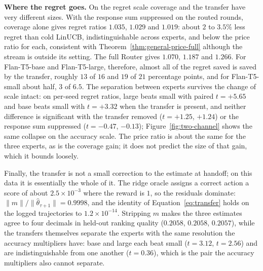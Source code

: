 \documentclass[anon]{alt2027} %
\begin{document}
\textbf{Where the regret goes.} On the regret scale coverage and the transfer
have very different sizes. With the response sum suppressed on the routed
rounds, coverage alone gives regret ratios $1.035$, $1.029$ and $1.019$:
about $2$ to $3.5\%$ less regret than cold LinUCB, indistinguishable across
experts, and below the price ratio for each, consistent with
Theorem~\ref{thm:general-price-full} although the stream is outside its setting.
The full Router gives $1.070$, $1.187$ and $1.266$. For Flan-T5-base and
Flan-T5-large, therefore, almost all of the regret saved is saved by the
transfer, roughly $13$ of $16$ and $19$ of $21$ percentage points, and for
Flan-T5-small about half, $3$ of $6.5$. The separation between experts
survives the change of scale intact: on per-seed regret ratios, large beats
small with paired $t=+5.65$ and base beats small with $t=+3.32$ when the
transfer is present, and neither difference is significant with the transfer
removed ($t=+1.25$, $+1.24$) or the response sum suppressed ($t=-0.47$,
$-0.13$); Figure~\ref{fig:two-channel} shows the same
collapse on the accuracy scale. The price ratio is about the same for the
three experts, as is the coverage gain; it does not predict the size of that
gain, which it bounds loosely.

Finally, the transfer is not a small correction to the estimate at handoff; on
this data it is essentially the whole of it. The ridge oracle assigns a
correct action a score of about $2.5\times10^{-3}$ where the reward is $1$, so
the residuals dominate: $\|m\|/\|\widehat\theta_{\tau+1}\|=0.9998$, and the
identity of Equation~\eqref{eq:transfer} holds on the logged trajectories
to $1.2\times10^{-14}$. Stripping $m$ makes the three estimates agree to four
decimals in held-out ranking quality ($0.2058$, $0.2058$, $0.2057$), while the
transfers themselves separate the experts with the same resolution the
accuracy multipliers have: base and large each beat small ($t=3.12$, $t=2.56$) and are
indistinguishable from one another ($t=0.36$), which is the pair the
accuracy multipliers also cannot separate.
\end{document}

